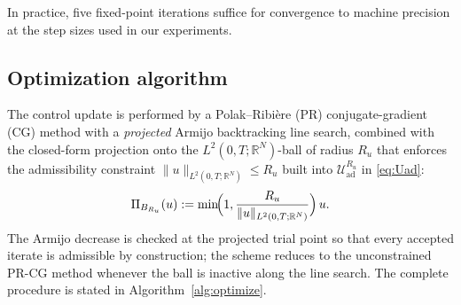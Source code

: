 \documentclass[12pt, reqno]{amsart}
\theoremstyle{plain}
\theoremstyle{definition}
\numberwithin{equation}{section}
\numberwithin{figure}{section}
\numberwithin{algorithm}{section}
\begin{document}
In practice, five fixed-point iterations suffice for convergence to machine precision at the step sizes used in our experiments.

\subsection{Optimization algorithm}\label{sec:algorithm}

The control update is performed by a Polak--Ribi\`ere (PR) conjugate-gradient (CG) method with a \emph{projected} Armijo backtracking line search, combined with the closed-form projection onto the $L^2(0,T;\mathbb R^N)$-ball of radius $R_u$ that enforces the admissibility constraint $\|u\|_{L^2(0,T;\mathbb R^N)}\le R_u$ built into $\mathcal U_{\mathrm{ad}}^{R_u}$ in \eqref{eq:Uad}:
\begin{equation}\label{eq:projection}
\Pi_{B_{R_u}}(u):=\min\!\Bigl(1,\frac{R_u}{\|u\|_{L^2(0,T;\mathbb R^N)}}\Bigr)\,u.
\end{equation}
The Armijo decrease is checked at the projected trial point so that every accepted iterate is admissible by construction; the scheme reduces to the unconstrained PR-CG method whenever the ball is inactive along the line search. The complete procedure is stated in Algorithm~\ref{alg:optimize}.
\end{document}
